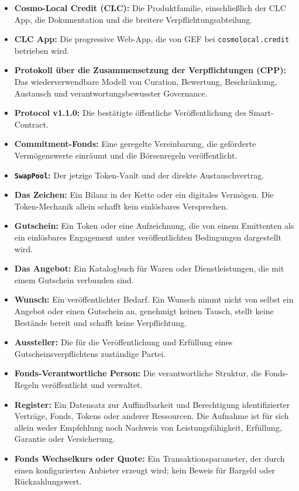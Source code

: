 \documentclass[11pt]{article}
\begin{document}
\begin{itemize}[leftmargin=*]
\item \textbf{Cosmo-Local Credit (CLC):} Die Produktfamilie, einschließlich der CLC App, die Dokumentation und die breitere Verpflichtungsabteilung.
\item \textbf{CLC App:} Die progressive Web-App, die von GEF bei \texttt{cosmolocal.credit} betrieben wird.
\item \textbf{Protokoll über die Zusammensetzung der Verpflichtungen (CPP):} Das wiederverwendbare Modell von Curation, Bewertung, Beschränkung, Austausch und verantwortungsbewusster Governance.
\item \textbf{Protocol v1.1.0:} Die bestätigte öffentliche Veröffentlichung des Smart-Contract.
\item \textbf{Commitment-Fonds:} Eine geregelte Vereinbarung, die geförderte Vermögenswerte einräumt und die Börsenregeln veröffentlicht.
\item \textbf{\texttt{SwapPool}:} Der jetzige Token-Vault und der direkte Austauschvertrag.
\item \textbf{Das Zeichen:} Ein Bilanz in der Kette oder ein digitales Vermögen. Die Token-Mechanik allein schafft kein einlösbares Versprechen.
\item \textbf{Gutschein:} Ein Token oder eine Aufzeichnung, die von einem Emittenten als ein einlösbares Engagement unter veröffentlichten Bedingungen dargestellt wird.
\item \textbf{Das Angebot:} Ein Katalogbuch für Waren oder Dienstleistungen, die mit einem Gutschein verbunden sind.
\item \textbf{Wunsch:} Ein veröffentlichter Bedarf. Ein Wunsch nimmt nicht von selbst ein Angebot oder einen Gutschein an, genehmigt keinen Tausch, stellt keine Bestände bereit und schafft keine Verpflichtung.
\item \textbf{Aussteller:} Die für die Veröffentlichung und Erfüllung eines Gutscheinsverpflichtens zuständige Partei.
\item \textbf{Fonds-Verantwortliche Person:} Die verantwortliche Struktur, die Fonds-Regeln veröffentlicht und verwaltet.
\item \textbf{Register:} Ein Datensatz zur Auffindbarkeit und Berechtigung identifizierter Verträge, Fonds, Tokens oder anderer Ressourcen. Die Aufnahme ist für sich allein weder Empfehlung noch Nachweis von Leistungsfähigkeit, Erfüllung, Garantie oder Versicherung.
\item \textbf{Fonds Wechselkurs oder Quote:} Ein Transaktionsparameter, der durch einen konfigurierten Anbieter erzeugt wird; kein Beweis für Bargeld oder Rückzahlungswert.

\end{itemize}
\end{document}
